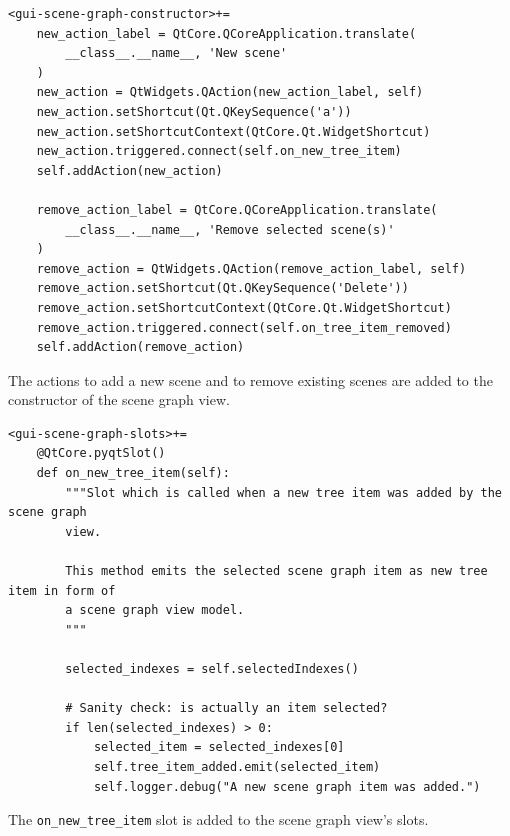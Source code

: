\documentclass[10pt, openright, notitlepage]{scrreprt}
\begin{document}
\begin{listing}[H]
\begin{verbatim}
<gui-scene-graph-constructor>+=
    new_action_label = QtCore.QCoreApplication.translate(
        __class__.__name__, 'New scene'
    )
    new_action = QtWidgets.QAction(new_action_label, self)
    new_action.setShortcut(Qt.QKeySequence('a'))
    new_action.setShortcutContext(QtCore.Qt.WidgetShortcut)
    new_action.triggered.connect(self.on_new_tree_item)
    self.addAction(new_action)
    
    remove_action_label = QtCore.QCoreApplication.translate(
        __class__.__name__, 'Remove selected scene(s)'
    )
    remove_action = QtWidgets.QAction(remove_action_label, self)
    remove_action.setShortcut(Qt.QKeySequence('Delete'))
    remove_action.setShortcutContext(QtCore.Qt.WidgetShortcut)
    remove_action.triggered.connect(self.on_tree_item_removed)
    self.addAction(remove_action)
\end{verbatim}
\caption{\label{lst:gui-scene-graph-constructor-01}
The actions to add a new scene and to remove existing scenes are added to the constructor of the scene graph view.}
\end{listing}

\begin{listing}[H]
\begin{verbatim}
<gui-scene-graph-slots>+=
    @QtCore.pyqtSlot()
    def on_new_tree_item(self):
        """Slot which is called when a new tree item was added by the scene graph
        view.
    
        This method emits the selected scene graph item as new tree item in form of
        a scene graph view model.
        """
    
        selected_indexes = self.selectedIndexes()
    
        # Sanity check: is actually an item selected?
        if len(selected_indexes) > 0:
            selected_item = selected_indexes[0]
            self.tree_item_added.emit(selected_item)
            self.logger.debug("A new scene graph item was added.")
\end{verbatim}
\caption{\label{lst:gui-scene-graph-slots-02}
The \texttt{on\_new\_tree\_item} slot is added to the scene graph view's slots.}
\end{listing}
\end{document}
